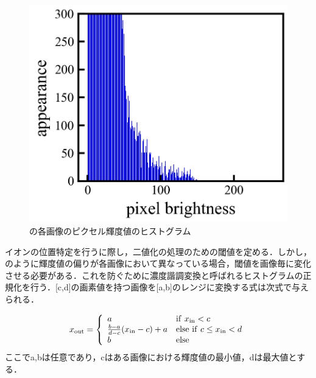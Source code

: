 \begin{figure}[h]
\begin{center}
\begin{minipage}{0.3\linewidth}
			\includegraphics[width=0.98\columnwidth]{./theory/figure/5/hist_2.jpg}
		\end{minipage}
	\end{center}
	\caption{の各画像のピクセル輝度値のヒストグラム}
	\label{fig:hist}
\end{figure}

イオンの位置特定を行うに際し，二値化の処理のための閾値を定める．しかし，のように輝度値の偏りが各画像において異なっている場合，閾値を画像毎に変化させる必要がある．これを防ぐために濃度諧調変換と呼ばれるヒストグラムの正規化を行う．[c,d]の画素値を持つ画像を[a,b]のレンジに変換する式は次式で与えられる．

\large
\begin{align}\label{eq:GS_trans}
x_{\rm out} = 
\left\{ 
\begin{array}{ll}
	a & {\rm if} \ x_{\rm in} < c \\
	\frac{b-a}{d-c}(x_{\rm in}-c) + a & {\rm else \ if} \ c \leq x_{\rm in} < d \\
	b &{\rm else}
\end{array} \right.
\end{align}
\normalsize
ここでa,bは任意であり，cはある画像における輝度値の最小値，dは最大値とする．

